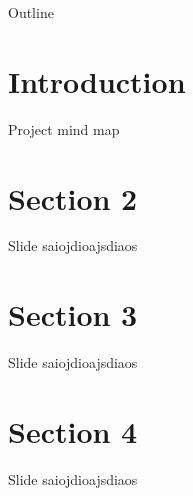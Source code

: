 \begin{frame}
\titlepage
\end{frame}

\begin{frame}{Outline}
\tableofcontents
\end{frame}

\section{Introduction} %
\begin{frame}{Project mind map}
\begin{center}
\scalebox{0.56} {
}
\end{center}

\end{frame}

\section{Section 2} %
\begin{frame}{Slide}
saiojdioajsdiaos
\end{frame}

\section{Section 3} %
\begin{frame}{Slide}
saiojdioajsdiaos
\end{frame}

\section{Section 4} %
\begin{frame}{Slide}
saiojdioajsdiaos
\end{frame}

